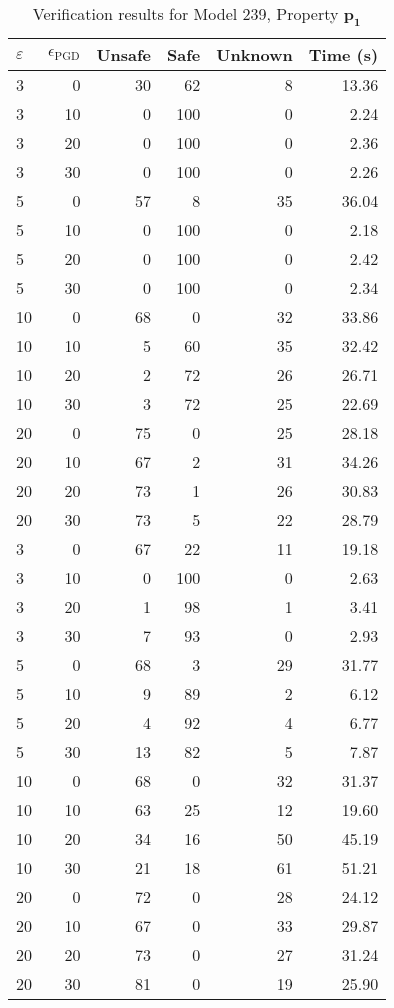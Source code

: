 \begin{table}[htbp]
\centering
\caption{Verification results for Model 239, Property $\mathbf{p_{1}}$}
\label{tab:model239_r1_part1}
\begin{tabular}{lrrrrr}
\toprule
$\varepsilon$ & $\epsilon_{\scriptscriptstyle\mathrm{PGD}}$ & Unsafe & Safe & Unknown & Time (s) \\
\midrule
3 & 0 & 30 & 62 & 8 & 13.36 \\
3 & 10 & 0 & 100 & 0 & 2.24 \\
3 & 20 & 0 & 100 & 0 & 2.36 \\
3 & 30 & 0 & 100 & 0 & 2.26 \\
5 & 0 & 57 & 8 & 35 & 36.04 \\
5 & 10 & 0 & 100 & 0 & 2.18 \\
5 & 20 & 0 & 100 & 0 & 2.42 \\
5 & 30 & 0 & 100 & 0 & 2.34 \\
10 & 0 & 68 & 0 & 32 & 33.86 \\
10 & 10 & 5 & 60 & 35 & 32.42 \\
10 & 20 & 2 & 72 & 26 & 26.71 \\
10 & 30 & 3 & 72 & 25 & 22.69 \\
20 & 0 & 75 & 0 & 25 & 28.18 \\
20 & 10 & 67 & 2 & 31 & 34.26 \\
20 & 20 & 73 & 1 & 26 & 30.83 \\
20 & 30 & 73 & 5 & 22 & 28.79 \\
3 & 0 & 67 & 22 & 11 & 19.18 \\
3 & 10 & 0 & 100 & 0 & 2.63 \\
3 & 20 & 1 & 98 & 1 & 3.41 \\
3 & 30 & 7 & 93 & 0 & 2.93 \\
5 & 0 & 68 & 3 & 29 & 31.77 \\
5 & 10 & 9 & 89 & 2 & 6.12 \\
5 & 20 & 4 & 92 & 4 & 6.77 \\
5 & 30 & 13 & 82 & 5 & 7.87 \\
10 & 0 & 68 & 0 & 32 & 31.37 \\
10 & 10 & 63 & 25 & 12 & 19.60 \\
10 & 20 & 34 & 16 & 50 & 45.19 \\
10 & 30 & 21 & 18 & 61 & 51.21 \\
20 & 0 & 72 & 0 & 28 & 24.12 \\
20 & 10 & 67 & 0 & 33 & 29.87 \\
20 & 20 & 73 & 0 & 27 & 31.24 \\
20 & 30 & 81 & 0 & 19 & 25.90 \\
\bottomrule
\end{tabular}
\end{table}

